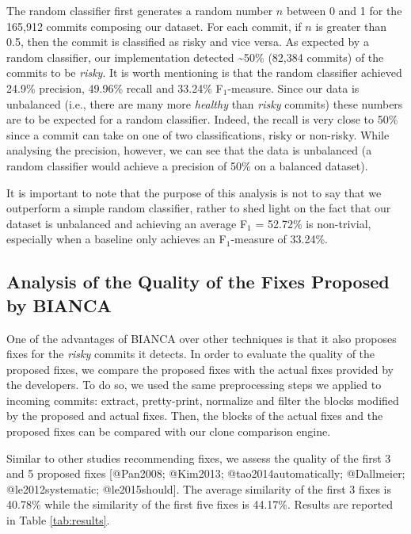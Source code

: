 The random classifier first generates a random number \(n\) between 0
and 1 for the 165,912 commits composing our dataset. For each commit, if
\(n\) is greater than 0.5, then the commit is classified as risky and
vice versa. As expected by a random classifier, our implementation
detected \textasciitilde{}50\% (82,384 commits) of the commits to be
\emph{risky}. It is worth mentioning is that the random classifier
achieved 24.9\% precision, 49.96\% recall and 33.24\% F\(_1\)-measure.
Since our data is unbalanced (i.e., there are many more \emph{healthy}
than \emph{risky} commits) these numbers are to be expected for a random
classifier. Indeed, the recall is very close to 50\% since a commit can
take on one of two classifications, risky or non-risky. While analysing
the precision, however, we can see that the data is unbalanced (a random
classifier would achieve a precision of 50\% on a balanced dataset).

It is important to note that the purpose of this analysis is not to say
that we outperform a simple random classifier, rather to shed light on
the fact that our dataset is unbalanced and achieving an average F\(_1\)
= 52.72\% is non-trivial, especially when a baseline only achieves an
F\(_1\)-measure of 33.24\%.

\subsection{Analysis of the Quality of the Fixes Proposed by
BIANCA}\label{analysis-of-the-quality-of-the-fixes-proposed-by-bianca}

One of the advantages of BIANCA over other techniques is that it also
proposes fixes for the \emph{risky} commits it detects. In order to
evaluate the quality of the proposed fixes, we compare the proposed
fixes with the actual fixes provided by the developers. To do so, we
used the same preprocessing steps we applied to incoming commits:
extract, pretty-print, normalize and filter the blocks modified by the
proposed and actual fixes. Then, the blocks of the actual fixes and the
proposed fixes can be compared with our clone comparison engine.

Similar to other studies recommending fixes, we assess the quality of
the first 3 and 5 proposed fixes {[}@Pan2008; @Kim2013;
@tao2014automatically; @Dallmeier; @le2012systematic; @le2015should{]}.
The average similarity of the first 3 fixes is 40.78\% while the
similarity of the first five fixes is 44.17\%. Results are reported in
Table \ref{tab:results}.

